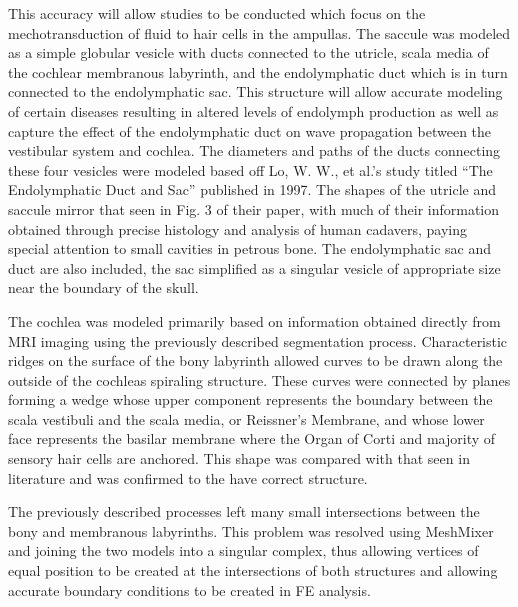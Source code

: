 \documentclass[12pt]{article}
\begin{document}
This accuracy will allow studies to be conducted which focus on the mechotransduction of fluid to hair cells in the ampullas. The saccule was modeled as a simple globular vesicle with ducts connected to the utricle, scala media of the cochlear membranous labyrinth, and the endolymphatic duct which is in turn connected to the endolymphatic sac. This structure will allow accurate modeling of certain diseases resulting in altered levels of endolymph production as well as capture the effect of the endolymphatic duct on wave propagation between the vestibular system and cochlea.  The diameters and paths of the ducts connecting these four vesicles were modeled based off Lo, W. W., et al.’s study titled “The Endolymphatic Duct and Sac” published in 1997. The shapes of the utricle and saccule mirror that seen in Fig. 3 of their paper, with much of their information obtained through precise histology and analysis of human cadavers, paying special attention to small cavities in petrous bone. The endolymphatic sac and duct are also included, the sac simplified as a singular vesicle of appropriate size near the boundary of the skull.\\
\vspace{0.5pt}


The cochlea was modeled primarily based on information obtained directly from MRI imaging using the previously described segmentation process. Characteristic ridges on the surface of the bony labyrinth allowed curves to be drawn along the outside of the cochleas spiraling structure. These curves were connected by planes forming a wedge whose upper component represents the boundary between the scala vestibuli and the scala media, or Reissner’s Membrane, and whose lower face represents the basilar membrane where the Organ of Corti and majority of sensory hair cells are anchored. This shape was compared with that seen in literature and was confirmed to the have correct structure. \cite{trevino:chinchmodel} \cite{ekdale:chinchanat} \cite{ni:cochmcx}


The previously described processes left many small intersections between the bony and membranous labyrinths. This problem was resolved using MeshMixer and joining the two models into a singular complex, thus allowing vertices of equal position to be created at the intersections of both structures and allowing accurate boundary conditions to be created in FE analysis. 
\end{document}
